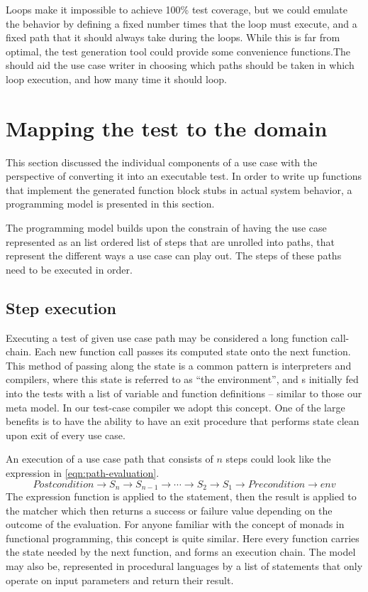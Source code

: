 \noindent Loops make it impossible to achieve 100\% test coverage, but we could emulate the behavior by defining a fixed number times that the loop must execute, and a fixed path that it should always take during the loops. While this is far from optimal, the test generation tool could provide some convenience functions.The should aid the use case writer in choosing which paths should be taken in which loop execution, and how many time it should loop.

\section{Mapping the test to the domain}
This section discussed the individual components of a use case with the perspective of converting it into an executable test. In order to write up functions that implement the generated function block stubs in actual system behavior, a programming model is presented in this section.\bigskip

\noindent The programming model builds upon the constrain of having the use case represented as an list ordered list of steps that are unrolled into paths, that represent the different ways a use case can play out. The steps of these paths need to be executed in order.
\subsection{Step execution}
\label{sec:step-execution}
\label{sec:use-case-environment}
Executing a test of given use case path may be considered a long function call-chain. Each new function call passes its computed state onto the next function. This method of passing along the state is a common pattern is interpreters and compilers, where this state is referred to as ``the environment'', and s initially fed into the tests with a list of variable and function definitions -- similar to those our meta model. In our test-case compiler we adopt this concept. One of the large benefits is to have the ability to have an exit procedure that performs state clean upon exit of every use case.\bigskip

\noindent An execution of a use case path that consists of $n$ steps could look like the expression in \ref{eqn:path-evaluation}. 
\begin{equation}
Postcondition \rightarrow S_n \rightarrow S_{n-1} \rightarrow \dotsb \rightarrow S_2 \rightarrow S_1 \rightarrow Precondition \rightarrow env
\label{eqn:path-evaluation}
\end{equation}
The expression function is applied to the statement, then the result is applied to the matcher which then returns a success or failure value depending on the outcome of the evaluation. For anyone familiar with the concept of monads in functional programming, this concept is quite similar. Here every function carries the state needed by the next function, and forms an execution chain. The model may also be, represented in procedural languages by a list of statements that only operate on input parameters and return their result.

